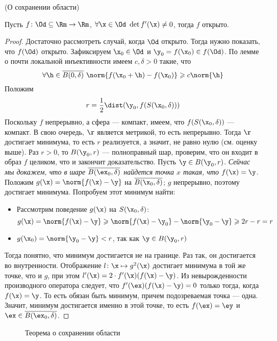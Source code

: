 \begin{theorem}(О сохранении области)

    Пусть $f \colon \Od \subseteq \Rm \to \Rm$, $\forall \x \in \Od~ \det{f'(\x)}
    \neq 0$, тогда $f$ открыто.
\end{theorem}
\begin{proof}
    Достаточно рассмотреть случай, когда $\Od$ открыто. Тогда нужно показать, что
    $f(\Od)$ открыто. Зафиксируем $\x_0 \in \Od$ и $\y_0 = f(\x_0) \in f(\Od)$.
    По лемме о почти локальной инъективности имеем $c, \delta > 0$ такие, что
\[
    \forall \h \in \overline{B(0, \delta)}~ \norm{f(\x_0 + \h) - f(\x_0)}
    \geqslant c \norm{\h}
\]
    Положим
\[
    r = \frac{1}{2}\dist(\y_0, f(S(\x_0, \delta)))
\]
    Поскольку $f$ непрерывно, а сфера --- компакт, имеем, что $f(S(\x_0, \delta))$
    --- компакт. В свою очередь, $\r$ является метрикой, то есть непрерывно. Тогда
    $\r$ достигает минимума, то есть $r$ реализуется, а значит, не равно нулю
    (см. оценку выше). Раз $r > 0$, то $B(\y_0, r)$ --- полноправный шар,
    проверим, что он входит в образ $f$ целиком, что и закончит доказательство.
	Пусть $\y \in B(\y_0, r)$. \textit{Сейчас мы докажем, что в шаре 
	$\overline{B(\ex_0, \delta)}$ найдется точка $x$ такая, что 
	$f(\x) = \y$}. Положим $g(\x) = \norm{f(\x) - \y}$ на
    $\overline{B(\x_0, \delta)}$; $g$ непрерывно, поэтому достигает минимума.
    Попробуем этот минимум найти:
\begin{itemize}
    \item Рассмотрим поведение $g(\x)$ на $S(\x_0, \delta)$:
\[
    g(\x) = \norm{f(\x) - \y} \geqslant \norm{f(\x) - \y_0} - \norm{\y_0 - \y}
    \geqslant 2r - r = r
\]
    \item $g(\x_0) = \norm{\y_0 - \y} < r$, так как $\y \in B(\y_0, r)$
\end{itemize}
    Тогда понятно, что минимум достигается не на границе. Раз так, он достигается
    во внутренности. Отображение $l\colon \x \mapsto g^2(\x)$ достигает минимума в
    той же точке, что и $g$, при этом $l'(\x) = 2 \cdot f'(\x)(f(\x) - \y)$. Из 
	невырожденности производного оператора следует, что $f'(\ex)(f(\x) - \y) = 0$
	только тогда, когда $f(\x) = \y$. То есть обязан быть минимум, причем подозреваемая
	точка --- одна. Значит, минимум достигается именно в этой точке, то есть 
	$f(\ex) = \ey$ и $\ex \in \overline{B(\ex_0, \delta)}$.
\end{proof}

\begin{figure}[ht]
    \centering
    \caption{Теорема о сохранении области}
\end{figure}

